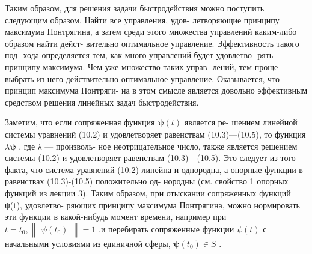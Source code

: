 \documentclass[8pt]{extarticle}
\begin{document}
Таким образом, для решения задачи быстродействия можно поступить следующим образом. Найти все управления, удов- летворяющие принципу максимума Понтрягина, а затем среди этого множества управлений каким-либо образом найти дейст- вительно оптимальное управление. Эффективность такого под- хода определяется тем, как много управлений будет удовлетво- рять принципу максимума. Чем уже множество таких управ- лений, тем проще выбрать из него действительно оптимальное управление. Оказывается, что принцип максимума Понтряги- на в этом смысле является довольно эффективным средством решения линейных задач быстродействия.

Заметим, что если сопряженная функция \(\mathbf{\psi }\left( t\right)\) является ре- шением линейной системы уравнений (10.2) и удовлетворяет равенствам (10.3)—(10.5), то функция \(\lambda \mathbf{\psi }\) , где λ — произволь- ное неотрицательное число, также является решением системы (10.2) и удовлетворяет равенствам (10.3)—(10.5). Это следует из того факта, что система уравнений (10.2) линейна и однородна, а опорные функции в равенствах (10.3)-(10.5) положительно од- нородны (см. свойство 1 опорных функций из лекции 3). Таким образом, при отыскании сопряженных функций ψ(t), удовлетво- ряющих принципу максимума Понтрягина, можно нормировать эти функции в какой-нибудь момент времени, например при \(t = {t}_{0},\left\lVert \begin{array}{c} {\psi \left( {t}_{0}\right) } \end{array} \right\rVert = 1\) ,и перебирать сопряженные функции \(\psi \left( t\right)\) с начальными условиями из единичной сферы, \(\mathbf{\psi }\left( {t}_{0}\right)  \in  S\) .
\end{document}
